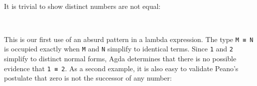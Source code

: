 \begin{fence}
\begin{code}%
\>[0]\AgdaSpace{}%
\AgdaSymbol{:}\AgdaSpace{}%
\AgdaSpace{}%
\AgdaSymbol{\{}\AgdaSpace{}%
\AgdaSymbol{:}\AgdaSpace{}%
\AgdaSymbol{\}}\AgdaSpace{}%
\AgdaSpace{}%
\AgdaSpace{}%
\AgdaSpace{}%
\AgdaSpace{}%
\AgdaSpace{}%
\<%
\\
\>[0]\AgdaSpace{}%
\AgdaSpace{}%
%
\>[7]\AgdaSymbol{=}%
\>[10]\AgdaSpace{}%
\AgdaSymbol{(}\AgdaSpace{}%
\AgdaSpace{}%
\AgdaSymbol{)}\<%
\end{code}
\end{fence}

It is trivial to show distinct numbers are not equal:

\begin{fence}
\begin{code}%
\>[0]\AgdaFunction{\AgdaUnderscore{}}\AgdaSpace{}%
\AgdaSymbol{:}\AgdaSpace{}%
\AgdaSpace{}%
\AgdaSpace{}%
\<%
\\
\>[0]\AgdaSymbol{\AgdaUnderscore{}}\AgdaSpace{}%
\AgdaSymbol{=}\AgdaSpace{}%
\<%
\end{code}
\end{fence}

This is our first use of an absurd pattern in a lambda expression. The
type \texttt{M\ ≡\ N} is occupied exactly when \texttt{M} and \texttt{N}
simplify to identical terms. Since \texttt{1} and \texttt{2} simplify to
distinct normal forms, Agda determines that there is no possible
evidence that \texttt{1\ ≡\ 2}. As a second example, it is also easy to
validate Peano's postulate that zero is not the successor of any number:

\begin{fence}
\begin{code}%
\>[0]\AgdaSpace{}%
\AgdaSymbol{:}\AgdaSpace{}%
\AgdaSpace{}%
\AgdaSymbol{\{}\AgdaSpace{}%
\AgdaSymbol{:}\AgdaSpace{}%
\AgdaSymbol{\}}\AgdaSpace{}%
\AgdaSpace{}%
\AgdaSpace{}%
\AgdaSpace{}%
\AgdaSpace{}%
\<%
\\
\>[0]\AgdaSpace{}%
\AgdaSymbol{=}\AgdaSpace{}%
\<%
\end{code}
\end{fence}

